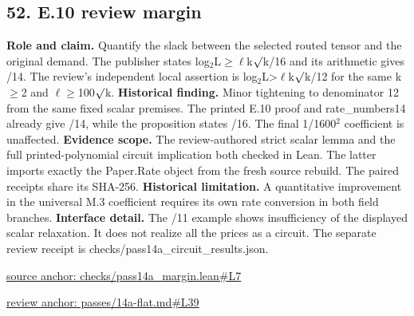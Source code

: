 \documentclass[11pt,letterpaper]{article}
\theoremstyle{definition}\newtheorem{definition}[theorem]{Definition}\newtheorem{example}[theorem]{Example}
\theoremstyle{remark}\newtheorem{remark}[theorem]{Remark}
\begin{document}
\subsection*{52. E.10 review margin}
\textbf{Role and claim.} Quantify the slack between the selected routed tensor and the original demand. The publisher states log\ensuremath{{}_2}L\ensuremath{\ge}\ensuremath{\ell}k\ensuremath{\sqrt{\vphantom{x}}}k/16 and its arithmetic gives /14. The review's independent local assertion is log\ensuremath{{}_2}L>\ensuremath{\ell}k\ensuremath{\sqrt{\vphantom{x}}}k/12 for the same k\ensuremath{\ge}2 and \ensuremath{\ell}\ensuremath{\ge}100\ensuremath{\sqrt{\vphantom{x}}}k.
\textbf{Historical finding.} Minor tightening to denominator 12 from the same fixed scalar premises. The printed E.10 proof and rate\_numbers14 already give /14, while the proposition states /16. The final 1/1600\ensuremath{{}^2} coefficient is unaffected.
\textbf{Evidence scope.} The review-authored strict scalar lemma and the full printed-polynomial circuit implication both checked in Lean. The latter imports exactly the Paper.Rate object from the fresh source rebuild. The paired receipts share its SHA-256.
\textbf{Historical limitation.} A quantitative improvement in the universal M.3 coefficient requires its own rate conversion in both field branches.
\textbf{Interface detail.} The /11 example shows insufficiency of the displayed scalar relaxation. It does not realize all the prices as a circuit. The separate review receipt is checks/pass14a\_circuit\_results.json.
\par\href{https://github.com/nousentllc/VP-VNP-Review/blob/8a7976933b6b2b4ffda1ad3a0dfb5fc6b6f023e8/checks/pass14a_margin.lean\#L7}{source anchor: checks/pass14a\_margin.lean\#L7}
\par\href{https://github.com/nousentllc/VP-VNP-Review/blob/8a7976933b6b2b4ffda1ad3a0dfb5fc6b6f023e8/passes/14a-flat.md\#L39}{review anchor: passes/14a-flat.md\#L39}
\goodbreak
{}
\hypertarget{claim.53}{}
\end{document}
